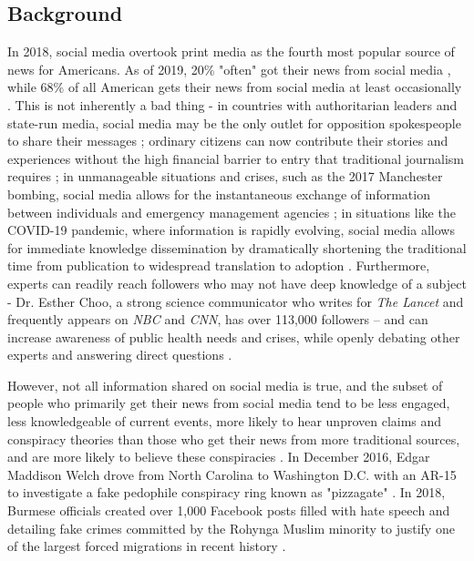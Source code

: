 \documentclass[12pt]{article}
\begin{document}
\subsection{Background}
In 2018, social media overtook print media as the fourth most popular source of news for Americans. As of 2019, 20\% "often" got their news from social media \cite{shearer2018social}, while 68\% of all American gets their news from social media at least occasionally \cite{matsa2018news}. This is not inherently a bad thing - in countries with authoritarian leaders and state-run media, social media may be the only outlet for opposition spokespeople to share their messages \cite{walker2014breaking}; ordinary citizens can now contribute their stories and experiences without the high financial barrier to entry that traditional journalism requires \cite{qualman2012socialnomics, tapscott2008wikinomics}; in unmanageable situations and crises, such as the 2017 Manchester bombing, social media allows for the instantaneous exchange of information between individuals and emergency management agencies \cite{mirbabaie2020breaking, eriksson2016facebook}; in situations like the COVID-19 pandemic, where information is rapidly evolving, social media allows for immediate knowledge dissemination by dramatically shortening the traditional time from publication to widespread translation to adoption \cite{chan2020social}. Furthermore, experts can readily reach followers who may not have deep knowledge of a subject - Dr. Esther Choo, a strong science communicator who writes for \textit{The Lancet} and frequently appears on \textit{NBC} and \textit{CNN}, has over 113,000 followers – and can increase awareness of public health needs and crises, while openly debating other experts and answering direct questions \cite{gottlieb2020information}.

However, not all information shared on social media is true, and the subset of people who primarily get their news from social media tend to be less engaged, less knowledgeable of current events, more likely to hear unproven claims and conspiracy theories than those who get their news from more traditional sources, and are more likely to believe these conspiracies \cite{mitchell2020americans}. In December 2016, Edgar Maddison Welch drove from North Carolina to Washington D.C. with an AR-15 to investigate a fake pedophile conspiracy ring known as "pizzagate" \cite{goldman2016comet}. In 2018, Burmese officials created over 1,000 Facebook posts filled with hate speech and detailing fake crimes committed by the Rohynga Muslim minority to justify one of the largest forced migrations in recent history \cite{subedar2018country}.
\end{document}
